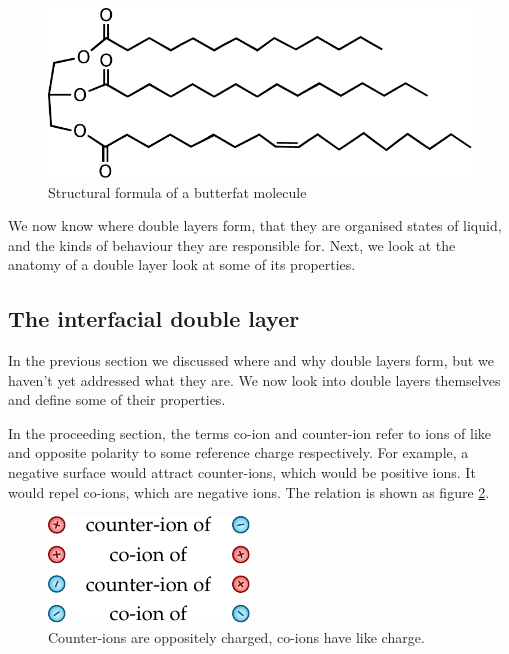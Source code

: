     \begin{figure}
        \begin{center}
            \includegraphics[scale=0.8]{content/introduction/graphics/butterfat}
        \end{center}
        \caption{Structural formula of a butterfat molecule}
        \label{fig:butterfat}
    \end{figure}

    We now know where double layers form, that they are organised states of liquid, and the kinds of behaviour they are responsible for.
    Next, we look at the anatomy of a double layer look at some of its properties.

  \subsection{The interfacial double layer}

    In the previous section we discussed where and why double layers form, but we haven't yet addressed what they are.
    We now look into double layers themselves and define some of their properties.

    In the proceeding section, the terms co-ion and counter-ion refer to ions of like and opposite polarity to some reference charge respectively.
    For example, a negative surface would attract counter-ions, which would be positive ions.
    It would repel co-ions, which are negative ions.
    The relation is shown as figure \ref{fig:counterAndCoIons}.

    \begin{figure}
      \begin{center}
        \includegraphics{content/introduction/graphics/counterAndCoIons}
      \end{center}
      \caption{Counter-ions are oppositely charged, co-ions have like charge.}
      \label{fig:counterAndCoIons}
    \end{figure}

